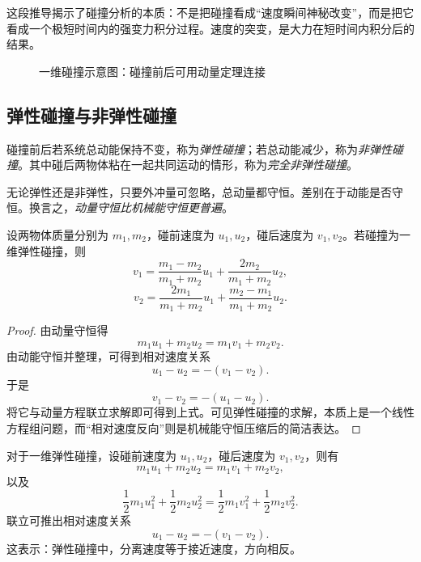这段推导揭示了碰撞分析的本质：不是把碰撞看成“速度瞬间神秘改变”，而是把它看成一个极短时间内的强变力积分过程。速度的突变，是大力在短时间内积分后的结果。

\begin{figure}[H]
\centering
{}
\caption{一维碰撞示意图：碰撞前后可用动量定理连接}
\end{figure}

\subsection{弹性碰撞与非弹性碰撞}

\begin{definition}
碰撞前后若系统总动能保持不变，称为\emph{弹性碰撞}；若总动能减少，称为\emph{非弹性碰撞}。其中碰后两物体粘在一起共同运动的情形，称为\emph{完全非弹性碰撞}。
\end{definition}

无论弹性还是非弹性，只要外冲量可忽略，总动量都守恒。差别在于动能是否守恒。换言之，\emph{动量守恒比机械能守恒更普遍}。

\begin{theorem}[一维弹性碰撞速度公式]
设两物体质量分别为 $m_1,m_2$，碰前速度为 $u_1,u_2$，碰后速度为 $v_1,v_2$。若碰撞为一维弹性碰撞，则
\[
 v_1=\frac{m_1-m_2}{m_1+m_2}u_1+\frac{2m_2}{m_1+m_2}u_2,
\]
\[
 v_2=\frac{2m_1}{m_1+m_2}u_1+\frac{m_2-m_1}{m_1+m_2}u_2.
\]
\end{theorem}

\begin{proof}
由动量守恒得
\[
 m_1u_1+m_2u_2=m_1v_1+m_2v_2.
\]
由动能守恒并整理，可得到相对速度关系
\[
 u_1-u_2=-(v_1-v_2).
\]
于是
\[
 v_1-v_2=-(u_1-u_2).
\]
将它与动量方程联立求解即可得到上式。可见弹性碰撞的求解，本质上是一个线性方程组问题，而“相对速度反向”则是机械能守恒压缩后的简洁表达。
\end{proof}

对于一维弹性碰撞，设碰前速度为 $u_1,u_2$，碰后速度为 $v_1,v_2$，则有
\[
m_1u_1+m_2u_2=m_1v_1+m_2v_2,
\]
以及
\[
\frac12 m_1u_1^2+\frac12 m_2u_2^2
=\frac12 m_1v_1^2+\frac12 m_2v_2^2.
\]
联立可推出相对速度关系
\[
u_1-u_2=-(v_1-v_2).
\]
这表示：弹性碰撞中，分离速度等于接近速度，方向相反。

